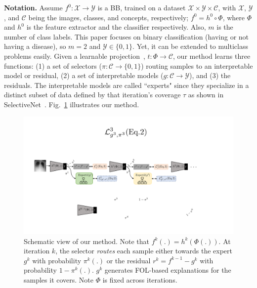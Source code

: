 \noindent\textbf{Notation.}
Assume $f^0: \mathcal{X} \rightarrow \mathcal{Y}$ is a BB, trained on a dataset $\mathcal{X} \times\mathcal{Y} \times \mathcal{C}$, with $\mathcal{X}$, $\mathcal{Y}$, and $\mathcal{C}$ being the images, classes, and concepts, respectively; $f^0=h^0 \circ \Phi$, where $\Phi$ and  $h^0$ is the feature extractor and the classifier respectively. Also, $m$ is the number of class labels. This paper focuses on binary classification (having or not having a disease), so $m=2$ and $\mathcal{Y} \in \{0, 1\}$. Yet, it can be extended to multiclass problems easily. Given a learnable projection~\cite{ghosh2023route}, $t: \Phi \rightarrow \mathcal{C}$, our method learns three functions: (1) a set of selectors ($\pi: \mathcal{C}\rightarrow \{0, 1\}$) routing samples to an interpretable model or residual, (2) a set of interpretable models ($g: \mathcal{C} \rightarrow \mathcal{Y}$), and (3) the residuals. The interpretable models are called ``experts" since they specialize in a distinct subset of data defined by that iteration's coverage $\tau$ as shown in SelectiveNet~\cite{rabanser2022selective}. Fig.~\ref{fig:schematic} illustrates our method.

\begin{figure}[t]
\begin{center}
\includegraphics[width=\linewidth]{plots/main/Schematic.pdf}
\caption{Schematic view of our method. Note that $f^k(.) = h^k(\Phi(.))$. At iteration $k$, the selector \emph{routes} each sample either towards the expert $g^k$ with probability $\pi^k(.)$ or the residual $r^k = f^{k-1} - g^k$ with probability $1-\pi^k(.)$. $g^k$ generates FOL-based explanations for the samples it covers. Note $\Phi$ is fixed across iterations.}
\label{fig:schematic}
\end{center}
\end{figure}

